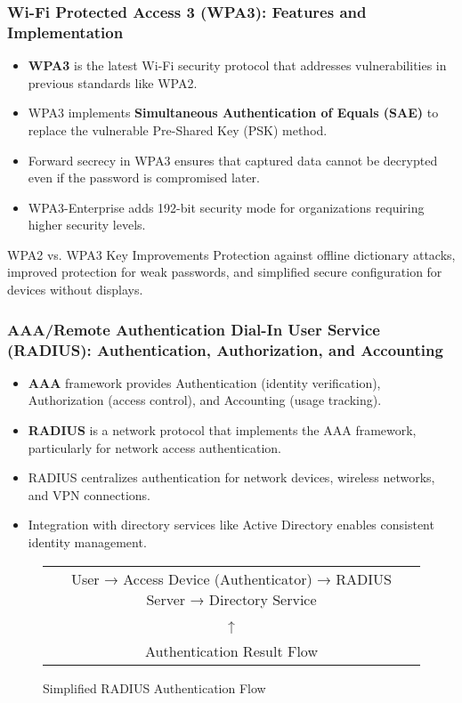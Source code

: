 \documentclass{beamer}
\begin{document}
\begin{frame}
    \frametitle{Wi-Fi Protected Access 3 (WPA3): Features and Implementation}
    
    \begin{itemize}
        \item \textbf{WPA3} is the latest Wi-Fi security protocol that addresses vulnerabilities in previous standards like WPA2.
        \item WPA3 implements \textbf{Simultaneous Authentication of Equals (SAE)} to replace the vulnerable Pre-Shared Key (PSK) method.
        \item Forward secrecy in WPA3 ensures that captured data cannot be decrypted even if the password is compromised later.
        \item WPA3-Enterprise adds 192-bit security mode for organizations requiring higher security levels.
    \end{itemize}
    
    \begin{alertblock}{WPA2 vs. WPA3 Key Improvements}
        Protection against offline dictionary attacks, improved protection for weak passwords, and simplified secure configuration for devices without displays.
    \end{alertblock}
\end{frame}

\begin{frame}
    \frametitle{AAA/Remote Authentication Dial-In User Service (RADIUS): Authentication, Authorization, and Accounting}
    
    \begin{itemize}
        \item \textbf{AAA} framework provides Authentication (identity verification), Authorization (access control), and Accounting (usage tracking).
        \item \textbf{RADIUS} is a network protocol that implements the AAA framework, particularly for network access authentication.
        \item RADIUS centralizes authentication for network devices, wireless networks, and VPN connections.
        \item Integration with directory services like Active Directory enables consistent identity management.
    \end{itemize}
    
    \begin{figure}
        \centering
        \scriptsize
        \begin{tabular}{c}
            User → Access Device (Authenticator) → RADIUS Server → Directory Service \\
            ↑ \\
            Authentication Result Flow \\
        \end{tabular}
        \caption{Simplified RADIUS Authentication Flow}
    \end{figure}
\end{frame}
\end{document}
